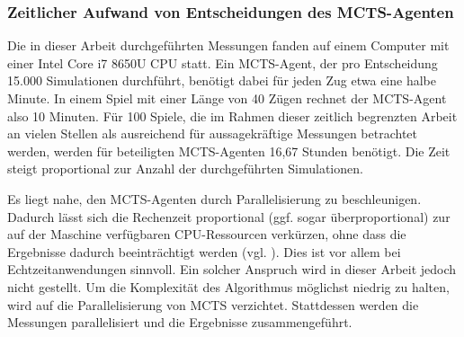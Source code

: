 \subsubsection{Zeitlicher Aufwand von Entscheidungen des MCTS-Agenten}

Die in dieser Arbeit durchgeführten Messungen fanden auf einem Computer mit einer Intel Core i7 8650U CPU statt. Ein MCTS-Agent, der pro Entscheidung 15.000 Simulationen durchführt, benötigt dabei für jeden Zug etwa eine halbe Minute. In einem Spiel mit einer Länge von 40 Zügen rechnet der MCTS-Agent also 10 Minuten. Für 100 Spiele, die im Rahmen dieser zeitlich begrenzten Arbeit an vielen Stellen als ausreichend für aussagekräftige Messungen betrachtet werden, werden für beteiligten MCTS-Agenten 16,67 Stunden benötigt. Die Zeit steigt proportional zur Anzahl der durchgeführten Simulationen.

Es liegt nahe, den MCTS-Agenten durch Parallelisierung zu beschleunigen. Dadurch lässt sich die Rechenzeit proportional (ggf. sogar überproportional) zur auf der Maschine verfügbaren CPU-Ressourcen verkürzen, ohne dass die Ergebnisse dadurch beeinträchtigt werden (vgl. \cite{Chaslot.2008}). Dies ist vor allem bei Echtzeitanwendungen sinnvoll. Ein solcher Anspruch wird in dieser Arbeit jedoch nicht gestellt. Um die Komplexität des Algorithmus möglichst niedrig zu halten, wird auf die Parallelisierung von MCTS verzichtet. Stattdessen werden die Messungen parallelisiert und die Ergebnisse zusammengeführt.



\newpage